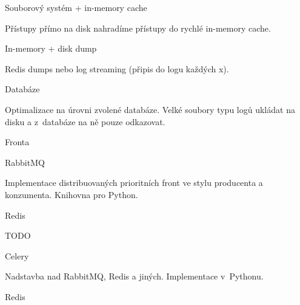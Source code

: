\secc Souborový systém + in-memory cache

Přístupy přímo na disk nahradíme přístupy do rychlé in-memory cache.

\secc In-memory + disk dump

Redis dumps nebo log streaming (připis do logu každých x).

\secc Databáze

Optimalizace na úrovni zvolené databáze.
Velké soubory typu logů ukládat na disku a z~databáze na ně pouze odkazovat.

\sec Fronta

\secc RabbitMQ

Implementace distribuovaných prioritních front ve stylu producenta a konzumenta. 
Knihovna pro Python.

\secc Redis

TODO

\secc Celery

Nadstavba nad RabbitMQ, Redis a jiných. 
Implementace v~Pythonu.

\secc Redis